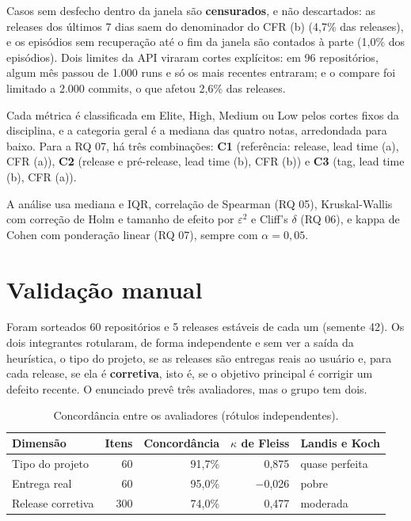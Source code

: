 \documentclass[12pt]{article}
\begin{document}
Casos sem desfecho dentro da janela são \textbf{censurados}, e não descartados: as releases dos últimos 7 dias saem do denominador do CFR (b) (4,7\% das releases), e os episódios sem recuperação até o fim da janela são contados à parte (1,0\% dos episódios). Dois limites da API viraram cortes explícitos: em 96 repositórios, algum mês passou de 1.000 runs e só os mais recentes entraram; e o compare foi limitado a 2.000 commits, o que afetou 2,6\% das releases.

Cada métrica é classificada em Elite, High, Medium ou Low pelos cortes fixos da disciplina, e a categoria geral é a mediana das quatro notas, arredondada para baixo. Para a RQ 07, há três combinações: \textbf{C1} (referência: release, lead time (a), CFR (a)), \textbf{C2} (release e pré-release, lead time (b), CFR (b)) e \textbf{C3} (tag, lead time (b), CFR (a)).

A análise usa mediana e IQR, correlação de Spearman (RQ 05), Kruskal-Wallis com correção de Holm e tamanho de efeito por $\varepsilon^2$ e Cliff's $\delta$ (RQ 06), e kappa de Cohen com ponderação linear (RQ 07), sempre com $\alpha = 0{,}05$.

\section{Validação manual}

Foram sorteados 60 repositórios e 5 releases estáveis de cada um (semente 42). Os dois integrantes rotularam, de forma independente e sem ver a saída da heurística, o tipo do projeto, se as releases são entregas reais ao usuário e, para cada release, se ela é \textbf{corretiva}, isto é, se o objetivo principal é corrigir um defeito recente. O enunciado prevê três avaliadores, mas o grupo tem dois.

\begin{table}[ht]
\centering
\caption{Concordância entre os avaliadores (rótulos independentes).}
\label{tab:kappa}
\small
\begin{tabular}{lrrrl}
\hline
Dimensão & Itens & Concordância & $\kappa$ de Fleiss & Landis e Koch \\
\hline
Tipo do projeto & 60 & 91,7\% & 0,875 & quase perfeita \\
Entrega real & 60 & 95,0\% & $-$0,026 & pobre \\
Release corretiva & 300 & 74,0\% & 0,477 & moderada \\
\hline
\end{tabular}
\end{table}
\end{document}
